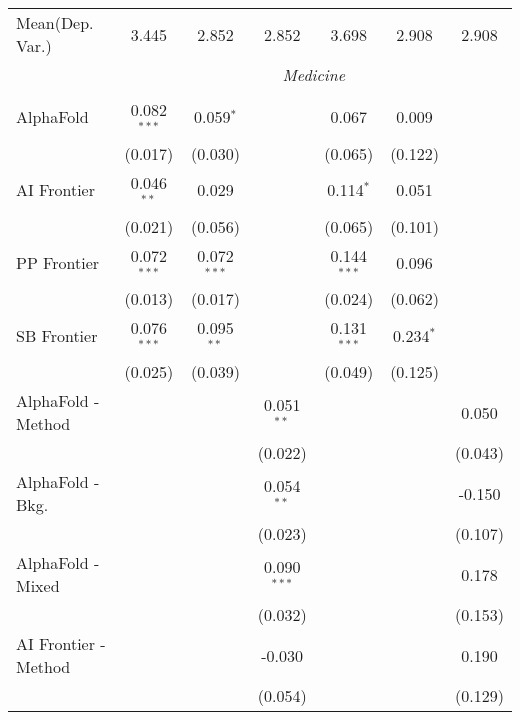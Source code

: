 \begin{tabular}{lcccccc}
Mean(Dep. Var.) & 3.445 & 2.852 & 2.852 & 3.698 & 2.908 & 2.908 \\
 & \multicolumn{6}{c}{\textit{Medicine}} \\ \\
   AlphaFold            & 0.082$^{***}$ & 0.059$^{*}$   &               & 0.067         & 0.009       &   \\   
                        & (0.017)       & (0.030)       &               & (0.065)       & (0.122)     &   \\   
   AI Frontier          & 0.046$^{**}$  & 0.029         &               & 0.114$^{*}$   & 0.051       &   \\   
                        & (0.021)       & (0.056)       &               & (0.065)       & (0.101)     &   \\   
   PP Frontier          & 0.072$^{***}$ & 0.072$^{***}$ &               & 0.144$^{***}$ & 0.096       &   \\   
                        & (0.013)       & (0.017)       &               & (0.024)       & (0.062)     &   \\   
   SB Frontier          & 0.076$^{***}$ & 0.095$^{**}$  &               & 0.131$^{***}$ & 0.234$^{*}$ &   \\   
                        & (0.025)       & (0.039)       &               & (0.049)       & (0.125)     &   \\   
   AlphaFold - Method   &               &               & 0.051$^{**}$  &               &             & 0.050\\   
                        &               &               & (0.022)       &               &             & (0.043)\\   
   AlphaFold - Bkg.     &               &               & 0.054$^{**}$  &               &             & -0.150\\   
                        &               &               & (0.023)       &               &             & (0.107)\\   
   AlphaFold - Mixed    &               &               & 0.090$^{***}$ &               &             & 0.178\\   
                        &               &               & (0.032)       &               &             & (0.153)\\   
   AI Frontier - Method &               &               & -0.030        &               &             & 0.190\\   
                        &               &               & (0.054)       &               &             & (0.129)\\   

\end{tabular}
